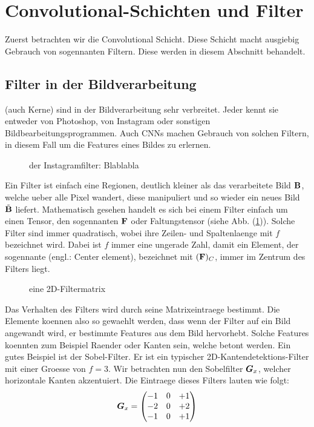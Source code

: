 \section{Convolutional-Schichten und Filter}
Zuerst betrachten wir die Convolutional Schicht. Diese Schicht macht ausgiebig
Gebrauch von sogennanten Filtern. Diese werden in diesem Abschnitt behandelt.

\subsection{Filter in der Bildverarbeitung}
 (auch Kerne) sind in der Bildverarbeitung sehr verbreitet. Jeder kennt sie entweder
von Photoshop, von Instagram oder sonstigen Bildbearbeitungsprogrammen.
Auch CNNs machen Gebrauch von solchen Filtern, in diesem Fall um die Features eines Bildes zu
erlernen.
\begin{figure}[h!]

  \caption{der Instagramfilter: Blablabla}
\end{figure}

\para{}
Ein Filter ist einfach eine Regionen, deutlich kleiner als das verarbeitete Bild
$\mathbf{B}$, welche
ueber alle Pixel wandert, diese manipuliert und so wieder ein neues Bild
$\tilde{\mathbf{B}}$ liefert.
Mathematisch gesehen handelt es sich bei einem Filter einfach um einen Tensor,
den sogennanten  $\mathbf{F}$ oder Faltungstensor (siehe Abb.
(\ref{fig:filtermatrix})). Solche Filter sind immer quadratisch, wobei ihre
Zeilen- und Spaltenlaenge mit $f$ bezeichnet wird. Dabei ist $f$ immer eine ungerade Zahl, damit ein
Element, der sogennante  (engl.: Center element), bezeichnet mit $(\mathbf{F})_C$,
immer im Zentrum des Filters liegt. \\

\begin{figure}[h!]
  \caption{eine 2D-Filtermatrix}
  \label{fig:filtermatrix}
\end{figure}
\para{}
Das Verhalten des Filters wird durch seine Matrixeintraege bestimmt.
Die Elemente koennen also so gewaehlt werden, dass wenn der Filter auf ein Bild
angewandt wird, er bestimmte Features aus dem Bild hervorhebt. Solche Features
koennten zum Beispiel Raender oder Kanten sein, welche betont werden.
\para{}
Ein gutes Beispiel ist der Sobel-Filter. Er ist ein typischer 2D-Kantendetektions-Filter mit einer
Groesse von $f = 3$. Wir betrachten nun den Sobelfilter $\bm{G}_x$, welcher
horizontale Kanten akzentuiert. Die Eintraege dieses Filters lauten wie folgt:
\begin{equation*}
  \bm{G}_x =
  \begin{pmatrix}
    -1 & 0 & +1 \\
    -2 & 0 & +2 \\
    -1 & 0 & +1 \\
  \end{pmatrix}
\end{equation*}

